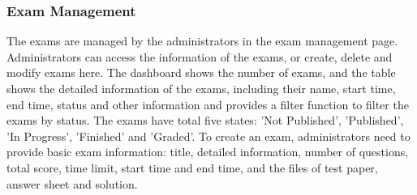 \documentclass[12pt]{article}
\begin{document}
\subsubsection{Exam Management}
The exams are managed by the administrators in the exam management page. Administrators can access the information of the exams, or create, delete and modify exams here.
The dashboard shows the number of exams, and the table shows the detailed information of the exams, including their name, start time, end time, status and other information and
provides a filter function to filter the exams by status.
The exams have total five states: 'Not Published', 'Published', 'In Progress', 'Finished' and 'Graded'.
To create an exam, administrators need to provide basic exam information: title, detailed information, number of questions, total score,
time limit, start time and end time, and the files of test paper, answer sheet and solution.


  
\end{document}
